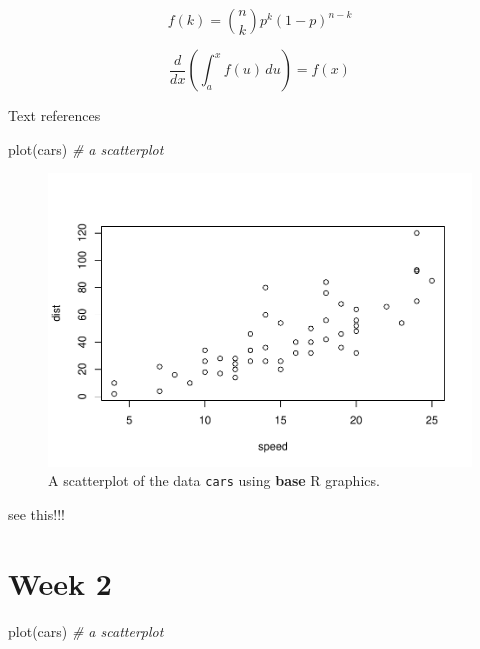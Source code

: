 \documentclass[
]{book}
\newenvironment{Shaded}{\begin{snugshade}}{\end{snugshade}}
\newcommand{\CommentTok}[1]{\textcolor[rgb]{0.56,0.35,0.01}{\textit{#1}}}
\newcommand{\FunctionTok}[1]{\textcolor[rgb]{0.00,0.00,0.00}{#1}}
\newcommand{\NormalTok}[1]{#1}
\begin{document}
\begin{equation} 
  f\left(k\right) = \binom{n}{k} p^k\left(1-p\right)^{n-k}
  \label{eq:binom}
\end{equation}

\begin{equation*} 
\frac{d}{dx}\left( \int_{a}^{x} f(u)\,du\right)=f(x)
\end{equation*}

Text references



\begin{Shaded}
\begin{Highlighting}[]
\FunctionTok{plot}\NormalTok{(cars)  }\CommentTok{\# a scatterplot}
\end{Highlighting}
\end{Shaded}

\begin{figure}
\centering
\includegraphics{01_Week_1_files/figure-latex/foo-1.pdf}
\caption{\label{fig:foo}A scatterplot of the data \texttt{cars} using \textbf{base} R graphics.}
\end{figure}

see this!!!

\hypertarget{week-2}{%
\chapter*{Week 2}\label{week-2}}

\begin{Shaded}
\begin{Highlighting}[]
\FunctionTok{plot}\NormalTok{(cars)  }\CommentTok{\# a scatterplot}
\end{Highlighting}
\end{Shaded}
\end{document}
